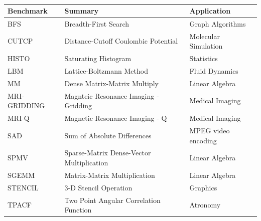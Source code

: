 \documentclass{thesis}
\begin{document}
\begin{center}
\begin{table}[h!]
\begin{latin}
\begin{tabular}{|p{}|p{}|p{}|}
\hline
Benchmark & Summary & Application \\
\hline
BFS & Breadth-First Search & Graph Algorithms \\
\hline
CUTCP & Distance-Cutoff Coulombic Potential & Molecular Simulation \\
\hline
HISTO & Saturating Histogram & Statistics \\
\hline
LBM & Lattice-Boltzmann Method & Fluid Dynamics \\
\hline
MM & Dense Matrix-Matrix Multiply & Linear Algebra \\
\hline
MRI-GRIDDING & Magnteic Resonance Imaging - Gridding & Medical Imaging\\
\hline
MRI-Q & Magnetic Resonance Imaging - Q & Medical Imaging \\
\hline
SAD & Sum of Absolute Differences & MPEG video encoding \\
\hline
SPMV & Sparse-Matrix Dense-Vector Multiplication & Linear Algebra \\
\hline
SGEMM & Matrix-Matrix Multiplication & Linear Algebra \\
\hline
STENCIL & 3-D Stencil Operation & Graphics \\
\hline
TPACF & Two Point Angular Correlation Function & Atronomy \\
\hline
\end{tabular}
\end{latin}
\caption{%
}
\label{table:parboilbenchmarks}
\end{table}
\end{center}
\end{document}
